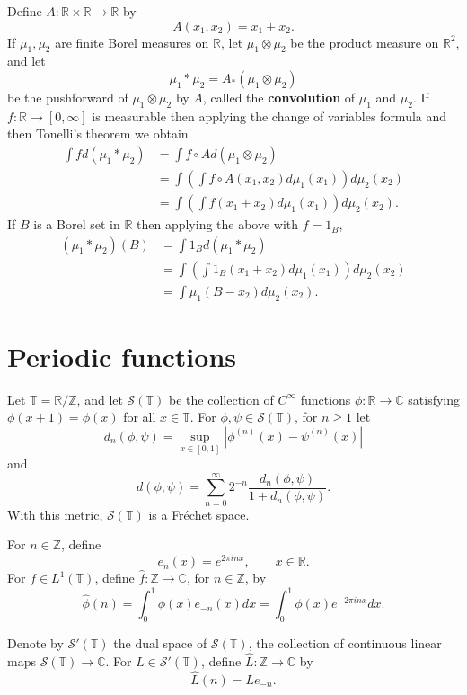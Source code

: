\documentclass{article}
\theoremstyle{definition}
\begin{document}
Define $A:\mathbb{R} \times \mathbb{R} \to \mathbb{R}$ by
\[
A(x_1,x_2) = x_1+x_2.
\]
If $\mu_1,\mu_2$ are finite Borel measures on $\mathbb{R}$,
let $\mu_1 \otimes \mu_2$ be the product measure on $\mathbb{R}^2$, and let
\[
\mu_1 * \mu_2=A_* (\mu_1 \otimes \mu_2)
\]
be the pushforward of $\mu_1 \otimes \mu_2$ by $A$, called the \textbf{convolution} of $\mu_1$ and $\mu_2$.
If $f:\mathbb{R} \to [0,\infty]$ is measurable then applying the change of variables formula and then Tonelli's
theorem we obtain
\begin{align*}
\int f d(\mu_1*\mu_2)&=\int f \circ A d(\mu_1 \otimes \mu_2)\\
&=\int \left( \int f \circ A(x_1,x_2) d\mu_1(x_1) \right) d\mu_2(x_2)\\
&=\int \left( \int f(x_1+x_2) d\mu_1(x_1) \right) d\mu_2(x_2).
\end{align*}
If $B$ is a Borel set in $\mathbb{R}$ then applying the above with $f=1_B$,
\begin{align*}
(\mu_1 * \mu_2)(B) &= \int 1_B d(\mu_1*\mu_2)\\
&= \int \left( \int 1_B(x_1+x_2) d\mu_1(x_1) \right) d\mu_2(x_2)\\
&=\int \mu_1(B-x_2) d\mu_2(x_2).
\end{align*}



\section{Periodic functions}
Let $\mathbb{T}=\mathbb{R}/\mathbb{Z}$, and let $\mathscr{S}(\mathbb{T})$ be the collection of
$C^\infty$ functions $\phi:\mathbb{R} \to \mathbb{C}$ satisfying
$\phi(x+1)=\phi(x)$ for all $x \in \mathbb{T}$.
For $\phi,\psi \in \mathscr{S}(\mathbb{T})$, for $n \geq 1$ let
\[
d_n(\phi,\psi) = \sup_{x \in [0,1]} |\phi^{(n)}(x)-\psi^{(n)}(x)|
\]
and
\[
d(\phi,\psi) = \sum_{n=0}^\infty 2^{-n}  \frac{d_n(\phi,\psi)}{1+d_n(\phi,\psi)}.
\]
With this metric, $\mathscr{S}(\mathbb{T})$ is a Fr\'echet space.

For $n \in \mathbb{Z}$, define
\[
e_n(x) = e^{2\pi inx},\qquad x \in \mathbb{R}.
\]
For $f \in L^1(\mathbb{T})$,
define $\widehat{f}:\mathbb{Z} \to \mathbb{C}$, 
 for $n \in \mathbb{Z}$, by
\[
\widehat{\phi}(n) =\int_0^1 \phi(x) e_{-n}(x) dx =  \int_0^1 \phi(x) e^{-2\pi inx} dx.
\]

Denote by $\mathscr{S}'(\mathbb{T})$ the dual space of $\mathscr{S}(\mathbb{T})$,
the collection of continuous linear maps $\mathscr{S}(\mathbb{T}) \to \mathbb{C}$.
For $L \in \mathscr{S}'(\mathbb{T})$, define $\widehat{L}:\mathbb{Z} \to \mathbb{C}$ by
\[
\widehat{L}(n) = L e_{-n}.
\]
\end{document}
